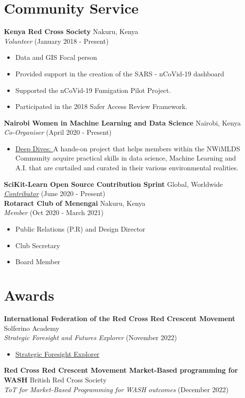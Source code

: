 \documentclass[line,margin,10pt]{res}
\begin{document}
\begin{resume}
\section{Community Service}
\textbf{Kenya Red Cross Society} \hfill Nakuru, Kenya\\
{\sl Volunteer} \hfill (January 2018 - Present)
\begin{itemize} \itemsep -2pt
    \item Data and GIS Focal person
    \item Provided support in the creation of the SARS - nCoVid-19 dashboard
    \item Supported the nCoVid-19 Fumigation Pilot Project.
    \item Participated in the 2018 Safer Access Review Framework.
\end{itemize}
\textbf{Nairobi Women in Machine Learning and Data Science} \hfill Nairobi, Kenya\\
{\sl Co-Organiser} \hfill (April 2020 - Present)
\begin{itemize} \itemsep -2pt
    \item \underline{Deep Dives: }
    A hands-on project that helps members within the NWiMLDS Community acquire practical skills in data science, Machine Learning and A.I. that are curtailed and curated in their various environmental realities.
\end{itemize}
\textbf{SciKit-Learn Open Source Contribution Sprint} \hfill Global, Worldwide\\
{\sl \href{https://sites.google.com/view/nyc-2020-scikit-sprint/contributors}{Contributor}} \hfill (June 2020 - Present) \\
\textbf{Rotaract Club of Menengai} \hfill Nakuru, Kenya\\
{\sl Member} \hfill (Oct 2020 - March 2021)
\begin{itemize} \itemsep -2pt
    \item Public Relations (P.R) and Design Director
    \item Club Secretary
    \item Board Member
\end{itemize}
{\vspace{-0,25cm}}

\section{Awards}
\textbf{International Federation of the Red Cross Red Crescent Movement} \hfill Solferino Academy\\
{\sl Strategic Foresight and Futures Explorer} \hfill (November 2022)
\begin{itemize} \itemsep -2pt
    \item \href{https://www.virtualbadge.io/certificate-validator?credential=cer-433e718d-cb4c-4c07-9436-1bbb67b6}{Strategic Foresight Explorer}
\end{itemize}
\textbf{Red Cross Red Crescent Movement Market-Based programming for WASH} \hfill British Red Cross Society\\
{\sl ToT for Market-Based Programming for WASH outcomes} \hfill (December 2022)


\end{resume}
\end{document}
